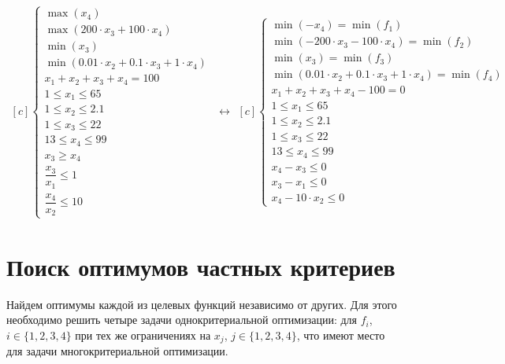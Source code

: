 \begin{equation*}
	\begin{aligned}[c]
		\begin{cases}
		\max(x_4) \\
		\max(200 \cdot x_3 + 100 \cdot x_4) \\
		\min(x_3) \\
		\min(0.01 \cdot x_2 + 0.1 \cdot x_3 + 1 \cdot x_4) \\
		x_1 + x_2 + x_3 + x_4 = 100 \\
		1 \leq x_1 \leq 65 \\
		1 \leq x_2 \leq 2.1 \\
		1 \leq x_3 \leq 22 \\
		13 \leq x_4 \leq 99 \\
		x_3 \geq x_4 \\
		\dfrac{x_3}{x_1} \leq 1 \\
		\dfrac{x_4}{x_2} \leq 10
		\end{cases}
	\end{aligned}
	\leftrightarrow
	\begin{aligned}[c]
		\begin{cases}
		\min(-x_4) = \min(f_1) \\
		\min(-200 \cdot x_3 - 100 \cdot x_4) = \min(f_2) \\
		\min(x_3) = \min(f_3) \\
		\min(0.01 \cdot x_2 + 0.1 \cdot x_3 + 1 \cdot x_4) = \min(f_4) \\
		x_1 + x_2 + x_3 + x_4 - 100 = 0 \\
		1 \leq x_1 \leq 65 \\
		1 \leq x_2 \leq 2.1 \\
		1 \leq x_3 \leq 22 \\
		13 \leq x_4 \leq 99 \\
		x_4 - x_3 \leq 0 \\
		x_3 - x_1 \leq 0 \\
		x_4 - 10 \cdot x_2 \leq 0
		\end{cases}
	\end{aligned}
\end{equation*}

\section{Поиск оптимумов частных критериев}
Найдем оптимумы каждой из целевых функций независимо от других. Для этого необходимо решить четыре задачи однокритериальной оптимизации: для $f_i$, $i \in \{1,2,3,4\}$ при тех же ограничениях на $x_j$, $j \in \{1, 2, 3, 4\}$, что имеют место для задачи многокритериальной оптимизации.

